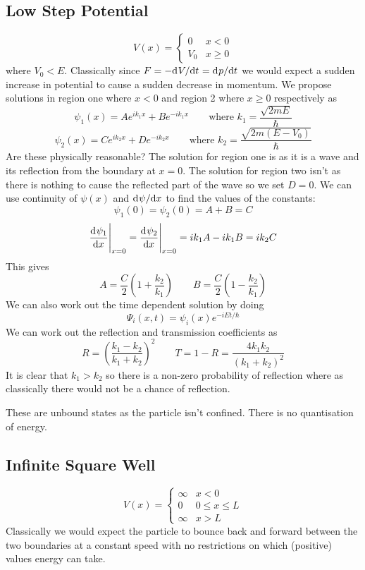 \documentclass{article}
\begin{document}
    \subsection{Low Step Potential}
    \[
        V(x) = 
        \begin{cases}
            0 & x < 0\\
            V_0 & x \ge 0
        \end{cases}
    \]
    where \(V_0 < E\).
    Classically since \(F = -\mathrm{d}^{}{V}/\mathrm{d}{t}^{} = \mathrm{d}^{}{p}/\mathrm{d}{t}^{}\) we would expect a sudden increase in potential to cause a sudden decrease in momentum.
    We propose solutions in region one where \(x < 0\) and region 2 where \(x \ge 0\) respectively as
    \[\psi_1(x) = Ae^{ik_1x} + Be^{-ik_1x}\qquad\text{where }k_1 = \frac{\sqrt{2mE}}{\hbar}\]
    \[\psi_2(x) = Ce^{ik_2x} + De^{-ik_2x}\qquad\text{where }k_2 = \frac{\sqrt{2m(E - V_0)}}{\hbar}\]
    Are these physically reasonable?
    The solution for region one is as it is a wave and its reflection from the boundary at \(x = 0\).
    The solution for region two isn't as there is nothing to cause the reflected part of the wave so we set \(D = 0\).
    We can use continuity of \(\psi(x)\) and \(\mathrm{d}^{}{\psi}/\mathrm{d}{x}^{}\) to find the values of the constants:
    \[\psi_1(0) = \psi_2(0) = A + B = C\]
    \[\dv[]{\psi_1}{x}\Biggr|_{x=0} = \dv[]{\psi_2}{x}\Biggr|_{x=0} = ik_1A - ik_1B = ik_2C\]
    This gives
    \[A = \frac{C}{2}\left(1 + \frac{k_2}{k_1}\right)\qquad B = \frac{C}{2}\left(1 - \frac{k_2}{k_1}\right)\]
    We can also work out the time dependent solution by doing
    \[\Psi_i(x, t) = \psi_i(x)e^{-iEt/\hbar}\]
    We can work out the reflection and transmission coefficients as
    \[R = \left(\frac{k_1 - k_2}{k_1 + k_2}\right)^2\qquad T = 1 - R = \frac{4k_1k_2}{(k_1 + k_2)^2}\]
    It is clear that \(k_1 > k_2\) so there is a non-zero probability of reflection where as classically there would not be a chance of reflection.
    
    These are unbound states as the particle isn't confined.
    There is no quantisation of energy.
    
    \subsection{Infinite Square Well}
    \[
        V(x) = 
        \begin{cases}
            \infty & x < 0\\
            0 & 0 \le x \le L\\
            \infty & x > L
        \end{cases}
    \]
    Classically we would expect the particle to bounce back and forward between the two boundaries at a constant speed with no restrictions on which (positive) values energy can take.
    
\end{document}

